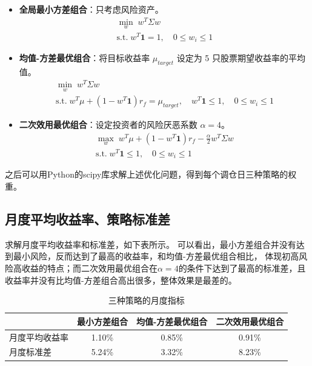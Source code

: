 \documentclass[a4paper,12pt]{article}
\begin{document}
\begin{itemize}
\item \textbf{全局最小方差组合}：只考虑风险资产。
\begin{equation*}
\begin{gathered}
\min_{w}\; w^T \Sigma w \\
\text{s.t.}\; w^T \mathbf{1} = 1,\quad 0 \le w_i \le 1
\end{gathered}
\end{equation*}

\item \textbf{均值-方差最优组合}：将目标收益率 $\mu_{target}$ 设定为 5 只股票期望收益率的平均值。
\begin{equation*}
\begin{gathered}
\min_{w}\; w^T \Sigma w \\
\text{s.t.}\; w^T \mu + \left(1-w^T \mathbf{1}\right) r_f = \mu_{target},\quad w^T \mathbf{1} \le 1,\quad 0 \le w_i \le 1
\end{gathered}
\end{equation*}

\item \textbf{二次效用最优组合}：设定投资者的风险厌恶系数 $\alpha = 4$。
\begin{equation*}
\begin{gathered}
\max_{w}\; w^T \mu + \left(1-w^T \mathbf{1}\right) r_f - \frac{\alpha}{2} w^T \Sigma w\\
\text{s.t.}\; w^T \mathbf{1} \le 1,\quad 0 \le w_i \le 1
\end{gathered}
\end{equation*}
\end{itemize}

之后可以用Python的scipy库求解上述优化问题，得到每个调仓日三种策略的权重。

\subsection{月度平均收益率、策略标准差}

求解月度平均收益率和标准差，如下表所示。
可以看出，最小方差组合并没有达到最小风险，反而达到了最高的收益率，和均值-方差最优组合相比，
体现初高风险高收益的特点；而二次效用最优组合在$\alpha=4$的条件下达到了最高的标准差，且收益率并没有比均值-方差组合高出很多，整体效果是最差的。

\begin{table}[H]
\centering
\caption{三种策略的月度指标}
\begin{tabular}{lccc}
\toprule
& 最小方差组合 & 均值-方差最优组合 & 二次效用最优组合 \\
\midrule
月度平均收益率 & 1.10\% & 0.85\% & 0.91\% \\
月度标准差     & 5.24\% & 3.32\% & 8.23\% \\
\bottomrule
\end{tabular}
\end{table}
\end{document}
